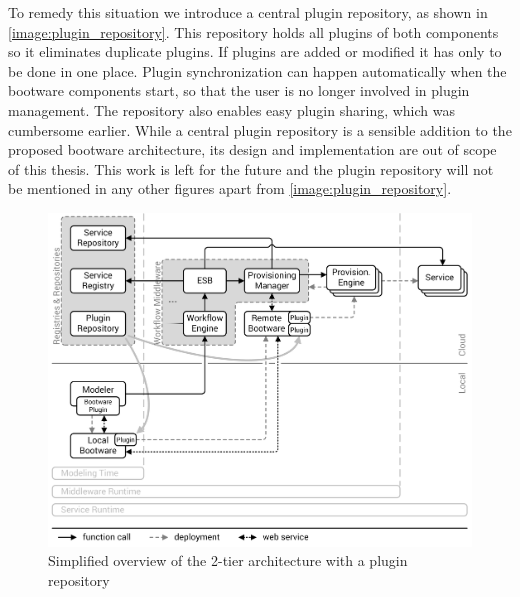 To remedy this situation we introduce a central plugin repository, as shown in \autoref{image:plugin_repository}.
This repository holds all plugins of both components so it eliminates duplicate plugins.
If plugins are added or modified it has only to be done in one place.
Plugin synchronization can happen automatically when the bootware components start, so that the user is no longer involved in plugin management.
The repository also enables easy plugin sharing, which was cumbersome earlier.
While a central plugin repository is a sensible addition to the proposed bootware architecture, its design and implementation are out of scope of this thesis.
This work is left for the future and the plugin repository will not be mentioned in any other figures apart from \autoref{image:plugin_repository}.

\begin{figure}[!htbp]
	\centering
	\includegraphics[resolution=600]{design/assets/plugin_repository}
	\caption{Simplified overview of the 2-tier architecture with a plugin repository}
	\label{image:plugin_repository}
\end{figure}
